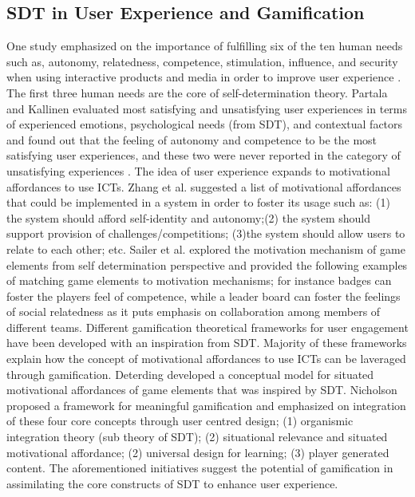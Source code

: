 \documentclass{sig-alternate}
\begin{document}
\subsection{SDT in User Experience and Gamification}
One study emphasized on the importance of fulfilling six of the ten human needs such as, autonomy, relatedness, competence, stimulation, influence, and security when using interactive products and media in order to improve user experience \cite{wiklund2009:needs}. The first three human needs are the core of self-determination theory. Partala and Kallinen \cite{partala2012:understanding} evaluated most satisfying and unsatisfying user experiences in terms of experienced emotions, psychological needs (from SDT), and contextual factors and found out that the feeling of autonomy and competence to be the most satisfying user experiences, and these two were never reported in the category of unsatisfying experiences \cite{partala2012:understanding}.\newline 
The idea of user experience expands to motivational affordances to use ICTs. Zhang et al.\cite{zhang2008:motivational} suggested a list of motivational affordances that could be implemented in a system in order to foster its usage such as: (1) the system should afford self-identity and autonomy;(2) the system should support provision of challenges/competitions; (3)the system should allow users to relate to each other; etc.
Sailer et al.\cite{sailer2013:psychological} explored the motivation mechanism of game elements from self determination perspective and provided the following examples of matching game elements to motivation mechanisms; for instance badges can foster the players feel of competence, while a leader board can foster the feelings of social relatedness as it puts emphasis on collaboration among members of different teams.\newline
Different gamification theoretical frameworks for user engagement have been developed with an inspiration from SDT. Majority of these frameworks explain how the concept of motivational affordances to use ICTs can be laveraged through gamification. Deterding \cite{deterding2011:situated} developed  a conceptual model for situated motivational affordances of game elements that was inspired by SDT. Nicholson \cite{nicholson2012:user} proposed a framework for meaningful gamification and emphasized on integration of these four core concepts through user centred design; (1) organismic integration theory (sub theory of SDT); (2) situational relevance and situated motivational affordance; (2) universal design for learning; (3) player generated content. The aforementioned initiatives suggest the potential of gamification in assimilating the core constructs of SDT to enhance user experience.\newline 
\end{document}
